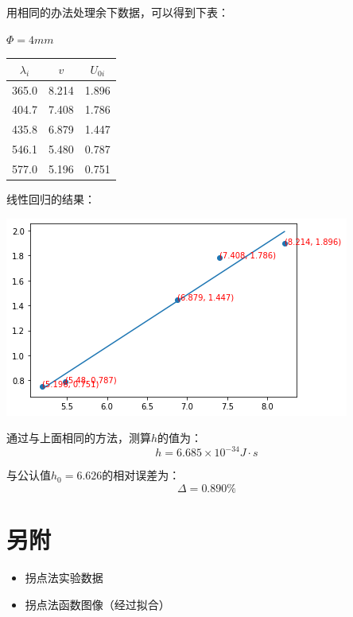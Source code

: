 \documentclass[a4paper]{ltxdoc}
\newenvironment{Figure}
  {\par\medskip\noindent\minipage{\linewidth}}
  {\endminipage\par\medskip}
\begin{document}
\begin{multicols}{2}
\begin{itemize}
              \bigskip
              用相同的办法处理余下数据，可以得到下表：

              \begin{Figure}
                  \centering
                  $\Phi = 4 mm$

                  \smallskip
                  \begin{tabular}{|c|c|c|}
                      \hline $\lambda _i$ & $v$   & $U_{0i}$ \\
                      \hline 365.0        & 8.214 & 1.896    \\
                      \hline 404.7        & 7.408 & 1.786    \\
                      \hline 435.8        & 6.879 & 1.447    \\
                      \hline 546.1        & 5.480 & 0.787    \\
                      \hline 577.0        & 5.196 & 0.751    \\ \hline
                  \end{tabular}
              \end{Figure}

              线性回归的结果：
              \begin{Figure}
                  \centering
                  \includegraphics[width=\linewidth]{12.png}
              \end{Figure}

              通过与上面相同的方法，测算$h$的值为：
              $$
                  h = 6.685 \times 10^{-34} J \cdot s
              $$

              与公认值$h_0 = 6.626$的相对误差为：
              $$
                  \Delta = 0.890\%
              $$
    \end{itemize}

    \section{另附}
    \begin{itemize}
        \item 拐点法实验数据
        \item 拐点法函数图像（经过拟合）
    \end{itemize}
\end{multicols}
\newpage
\end{document}
